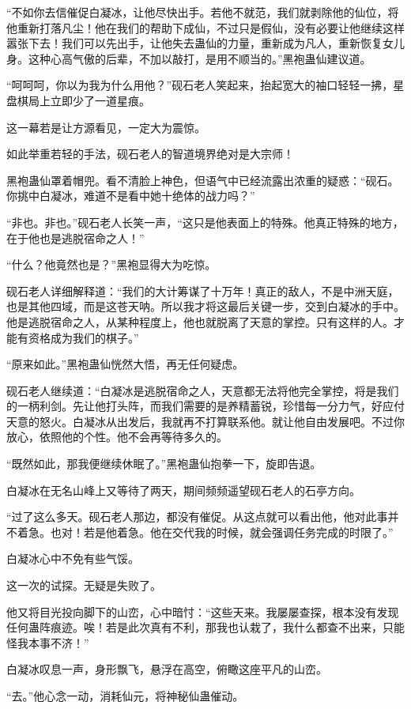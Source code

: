 \begin{this_body}
“不如你去信催促白凝冰，让他尽快出手。若他不就范，我们就剥除他的仙位，将他重新打落凡尘！他在我们的帮助下成仙，不过只是假仙，没有必要让他继续这样嚣张下去！我们可以先出手，让他失去蛊仙的力量，重新成为凡人，重新恢复女儿身。这种心高气傲的后辈，不加以敲打，是用不顺当的。”黑袍蛊仙建议道。

“呵呵呵，你以为我为什么用他？”砚石老人笑起来，抬起宽大的袖口轻轻一拂，星盘棋局上立即少了一道星痕。

这一幕若是让方源看见，一定大为震惊。

如此举重若轻的手法，砚石老人的智道境界绝对是大宗师！

黑袍蛊仙罩着帽兜。看不清脸上神色，但语气中已经流露出浓重的疑惑：“砚石。你挑中白凝冰，难道不是看中她十绝体的战力吗？”

“非也。非也。”砚石老人长笑一声，“这只是他表面上的特殊。他真正特殊的地方，在于他也是逃脱宿命之人！”

“什么？他竟然也是？”黑袍显得大为吃惊。

砚石老人详细解释道：“我们的大计筹谋了十万年！真正的敌人，不是中洲天庭，也是其他四域，而是这苍天呐。所以我才将这最后关键一步，交到白凝冰的手中。他是逃脱宿命之人，从某种程度上，他也就脱离了天意的掌控。只有这样的人。才能有资格成为我们的棋子。”

“原来如此。”黑袍蛊仙恍然大悟，再无任何疑虑。

砚石老人继续道：“白凝冰是逃脱宿命之人，天意都无法将他完全掌控，将是我们的一柄利剑。先让他打头阵，而我们需要的是养精蓄锐，珍惜每一分力气，好应付天意的怒火。白凝冰从出发后，我就再不打算联系他。就让他自由发展吧。不过你放心，依照他的个性。他不会再等待多久的。

“既然如此，那我便继续休眠了。”黑袍蛊仙抱拳一下，旋即告退。

白凝冰在无名山峰上又等待了两天，期间频频遥望砚石老人的石亭方向。

“过了这么多天。砚石老人那边，都没有催促。从这点就可以看出他，他对此事并不着急。也对！若是他着急。他在交代我的时候，就会强调任务完成的时限了。”

白凝冰心中不免有些气馁。

这一次的试探。无疑是失败了。

他又将目光投向脚下的山峦，心中暗忖：“这些天来。我屡屡查探，根本没有发现任何蛊阵痕迹。唉！若是此次真有不利，那我也认栽了，我什么都查不出来，只能怪我本事不济！”

白凝冰叹息一声，身形飘飞，悬浮在高空，俯瞰这座平凡的山峦。

“去。”他心念一动，消耗仙元，将神秘仙蛊催动。


\end{this_body}
